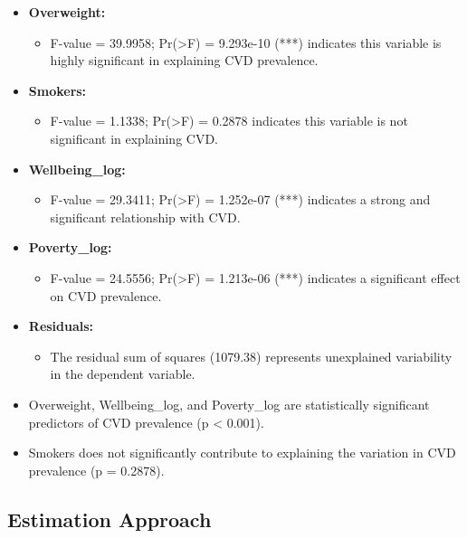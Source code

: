 \documentclass[
]{article}
\providecommand{\tightlist}{%
  \setlength{\itemsep}{0pt}\setlength{\parskip}{0pt}}
\begin{document}
\begin{itemize}
\tightlist
\item
  \textbf{Overweight:}

  \begin{itemize}
  \tightlist
  \item
    F-value = 39.9958; Pr(\textgreater F) = 9.293e-10 (***) indicates
    this variable is highly significant in explaining CVD prevalence.
  \end{itemize}
\item
  \textbf{Smokers:}

  \begin{itemize}
  \tightlist
  \item
    F-value = 1.1338; Pr(\textgreater F) = 0.2878 indicates this
    variable is not significant in explaining CVD.
  \end{itemize}
\item
  \textbf{Wellbeing\_log:}

  \begin{itemize}
  \tightlist
  \item
    F-value = 29.3411; Pr(\textgreater F) = 1.252e-07 (***) indicates a
    strong and significant relationship with CVD.
  \end{itemize}
\item
  \textbf{Poverty\_log:}

  \begin{itemize}
  \tightlist
  \item
    F-value = 24.5556; Pr(\textgreater F) = 1.213e-06 (***) indicates a
    significant effect on CVD prevalence.
  \end{itemize}
\item
  \textbf{Residuals:}

  \begin{itemize}
  \tightlist
  \item
    The residual sum of squares (1079.38) represents unexplained
    variability in the dependent variable.
  \end{itemize}
\item
  Overweight, Wellbeing\_log, and Poverty\_log are statistically
  significant predictors of CVD prevalence (p \textless{} 0.001).
\item
  Smokers does not significantly contribute to explaining the variation
  in CVD prevalence (p = 0.2878).
\end{itemize}

\subsection{Estimation Approach}\label{estimation-approach}
\end{document}
